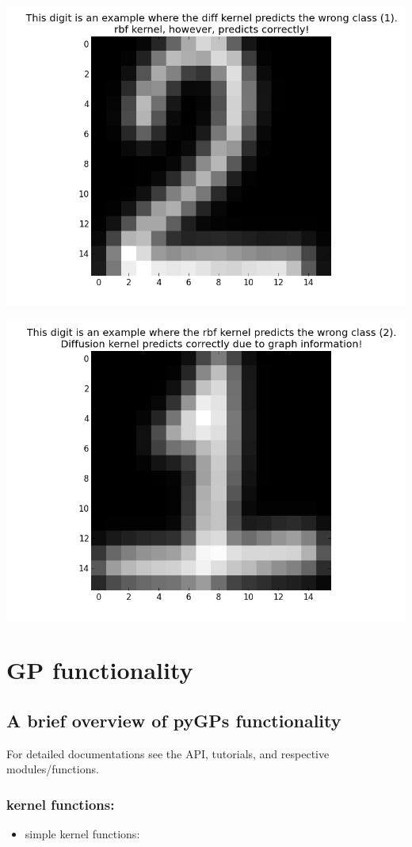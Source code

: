 \documentclass[letterpaper,10pt,english]{sphinxmanual}
\begin{document}
\includegraphics[width=0.500\linewidth]{_images/digitDiffwrong.png}

\includegraphics[width=0.500\linewidth]{_images/digitRBFwrong.png}


\section{GP functionality}
\label{index:gp-functionality}

\subsection{A brief overview of pyGPs functionality}
\label{functionality:a-brief-overview-of-pygps-functionality}\label{functionality::doc}
For detailed documentations see the API, tutorials, and respective modules/functions.


\subsubsection{kernel functions:}
\label{functionality:kernel-functions}\begin{itemize}
\item {} 
simple kernel functions:

\end{itemize}
\end{document}
